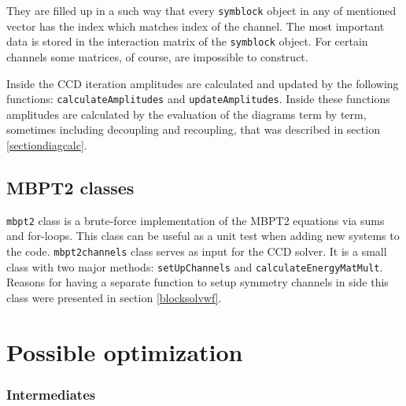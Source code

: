 \documentclass[twoside,english]{uiofysmaster}
\newcommand{\classname}[1]{\texttt{#1}}
\begin{document}
They are filled up in a such way that every \classname{symblock} object in any of mentioned vector has the index which matches index of the channel. The most important data is stored in the interaction matrix of the \classname{symblock} object. For certain channels some matrices, of course, are impossible to construct. 

Inside the CCD iteration amplitudes are calculated and updated by the following functions: \classname{calculateAmplitudes} and \classname{updateAmplitudes}. Inside these functions amplitudes are calculated by the evaluation of the diagrams term by term, sometimes including decoupling and recoupling, that was described in section \ref{sectiondiagcalc}.


\subsection{MBPT2 classes}
\classname{mbpt2} class is a brute-force implementation of the MBPT2 equations via sums and for-loops. This class can be useful as a unit test when adding new systems to the code.
\classname{mbpt2channels} class serves as input for the CCD solver. It is a small class with two major methods: \classname{setUpChannels} and \classname{calculateEnergyMatMult}. Reasons for having a separate function to setup symmetry channels in side this class were presented in section \ref{blocksolvwf}.

\section{Possible optimization}

\subsubsection{Intermediates}
\end{document}
